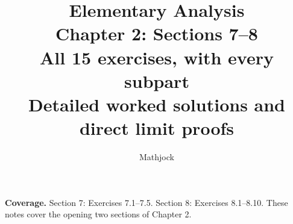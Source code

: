 
\title{\textbf{Elementary Analysis}\\[0.3em]
Chapter 2: Sections 7--8\\[0.4em]
\large All 15 exercises, with every subpart\\
Detailed worked solutions and direct limit proofs}
\author{Mathjock}
\date{}

\maketitle
\bookinfo
\par\textbf{Coverage.} Section 7: Exercises 7.1--7.5.
Section 8: Exercises 8.1--8.10.
These notes cover the opening two sections of Chapter 2.
\tableofcontents
\clearpage
\setcounter{section}{6}

\clearpage


